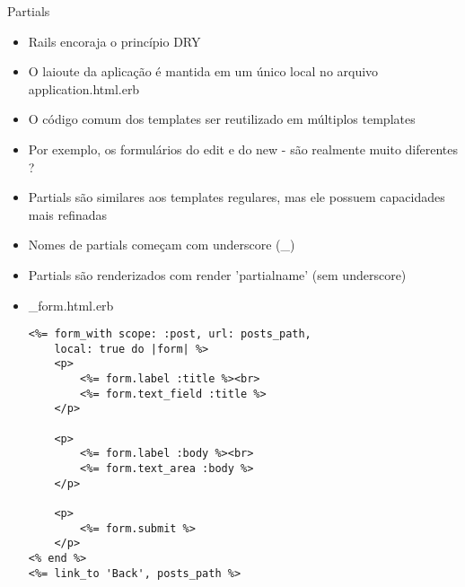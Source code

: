 \begin{frame}{Partials}
	\begin{itemize}
		\item Rails encoraja o princípio \alert{DRY}	
		\item O laioute da aplicação é mantida em um único local no arquivo \alert{application.html.erb}
		\item O código comum dos templates ser reutilizado em \alert{múltiplos templates}
		\item Por exemplo, os formulários do \alert{edit} e do \alert{new} - são realmente muito diferentes ?
		\item Partials são similares aos templates regulares, mas ele possuem capacidades mais \alert{refinadas}
		\item Nomes de partials começam com \alert{underscore} (\_) 
		\item Partials são renderizados com \alert{render 'partialname'} (sem underscore)
\framebreak
		\item \alert{\_form.html.erb}
		\begin{lstlisting}[style=RubyInputStyle, caption=views/posts/\_form.html.erb]
<%= form_with scope: :post, url: posts_path, 
	local: true do |form| %>
	<p>
		<%= form.label :title %><br>
		<%= form.text_field :title %>
	</p>
	
	<p>
		<%= form.label :body %><br>
		<%= form.text_area :body %>
	</p>
	
	<p>
		<%= form.submit %>
	</p>
<% end %>	
<%= link_to 'Back', posts_path %>
		\end{lstlisting}
	\end{itemize}	
\end{frame}


